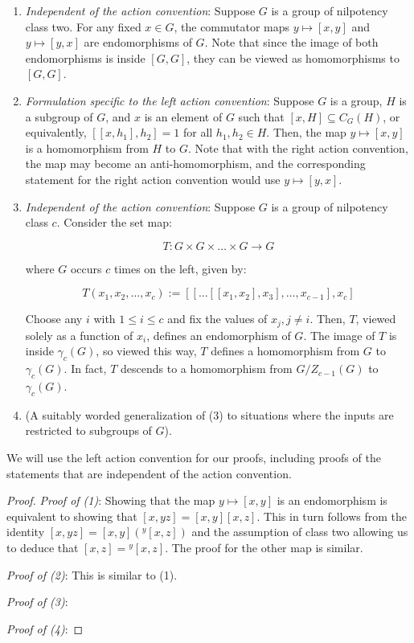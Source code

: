 \begin{lemma}\label{lemma:iterated-commutator-is-multilinear}
  \begin{enumerate}
  \item {\em Independent of the action convention}: Suppose $G$ is a
    group of nilpotency class two. For any fixed $x \in G$, the
    commutator maps $y \mapsto [x,y]$ and $y \mapsto [y,x]$ are
    endomorphisms of $G$. Note that since the image of both
    endomorphisms is inside $[G,G]$, they can be viewed as
    homomorphisms to $[G,G]$.
  \item {\em Formulation specific to the left action convention}:
    Suppose $G$ is a group, $H$ is a subgroup of $G$, and $x$ is an
    element of $G$ such that $[x,H] \subseteq C_G(H)$, or
    equivalently, $[[x,h_1],h_2] = 1$ for all $h_1, h_2 \in H$. Then,
    the map $y \mapsto [x,y]$ is a homomorphism from $H$ to $G$. Note
    that with the right action convention, the map may become an
    anti-homomorphism, and the corresponding statement for the right
    action convention would use $y \mapsto [y,x]$.
  \item {\em Independent of the action convention}: Suppose $G$ is a
    group of nilpotency class $c$. Consider the set map:

    $$T: G \times G \times \dots \times G \to G$$

    where $G$ occurs $c$ times on the left, given by:

    $$T(x_1,x_2,\dots,x_c) := [[ \dots [[x_1,x_2],x_3],\dots,x_{c-1}],x_c]$$

    Choose any $i$ with $1 \le i \le c$ and fix the values of $x_j, j
    \ne i$. Then, $T$, viewed solely as a function of $x_i$, defines
    an endomorphism of $G$. The image of $T$ is inside $\gamma_c(G)$,
    so viewed this way, $T$ defines a homomorphism from $G$ to
    $\gamma_c(G)$. In fact, $T$ descends to a homomorphism from
    $G/Z_{c-1}(G)$ to $\gamma_c(G)$.
  \item (A suitably worded generalization of (3) to situations where
    the inputs are restricted to subgroups of $G$). %
  \end{enumerate}
\end{lemma}

We will use the left action convention for our proofs, including
proofs of the statements that are independent of the action
convention.

\begin{proof}
  {\em Proof of (1)}: Showing that the map $y \mapsto [x,y]$ is an
  endomorphism is equivalent to showing that $[x,yz] =
  [x,y][x,z]$. This in turn follows from the identity $[x,yz] =
  [x,y]({}^y[x,z])$ and the assumption of class two allowing us to
  deduce that $[x,z] = {}^y[x,z]$. The proof for the other map is
  similar.

  {\em Proof of (2)}: This is similar to (1).

  {\em Proof of (3)}: %

  {\em Proof of (4)}: %
\end{proof}
